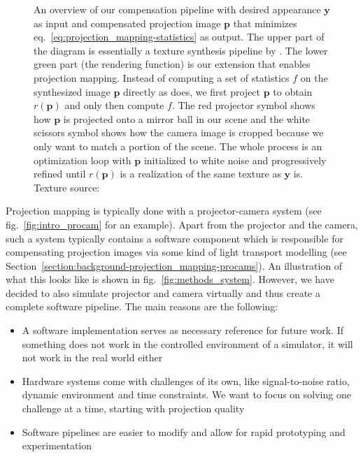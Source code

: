 \begin{figure}[]
    \centering
    \hspace*{-8mm}\hspace*{8mm}
    \caption{An overview of our compensation pipeline with desired appearance \(\bm{y}\) as input and compensated projection image \(\bm{p}\) that minimizes eq.~\ref{eq:projection_mapping-statistics} as output. The upper part of the diagram is essentially a texture synthesis pipeline by \citet{Gatys2015}. The lower green part (the rendering function) is our extension that enables projection mapping. Instead of computing a set of statistics \(f\) on the synthesized image \(\bm{p}\) directly as \citet{Gatys2015} does, we first project \(\bm{p}\) to obtain \(r(\bm{p})\) and only then compute \(f\). The red projector symbol shows how \(\bm{p}\) is projected onto a mirror ball in our scene and the white scissors symbol shows how the camera image is cropped because we only want to match a portion of the scene. The whole process is an optimization loop with \(\bm{p}\) initialized to white noise and progressively refined until \(r(\bm{p})\) is a realization of the same texture as \(\bm{y}\) is. Texture source: \citet{Pixar128}}
    \label{fig:methods_pipeline}
\end{figure}

Projection mapping is typically done with a projector-camera system (see fig.~\ref{fig:intro_procam} for an example). Apart from the projector and the camera, such a system typically contains a software component which is responsible for compensating projection images via some kind of light transport modelling (see Section~\ref{section:background-projection_mapping-procams}). An illustration of what this looks like is shown in fig.~\ref{fig:methods_system}. However, we have decided to also simulate projector and camera virtually and thus create a complete software pipeline. The main reasons are the following:

\begin{itemize}
    \item A software implementation serves as necessary reference for future work. If something does not work in the controlled environment of a simulator, it will not work in the real world either
    \item Hardware systems come with challenges of its own, like signal-to-noise ratio, dynamic environment and time constraints. We want to focus on solving one challenge at a time, starting with projection quality
    \item Software pipelines are easier to modify and allow for rapid prototyping and experimentation
\end{itemize}


